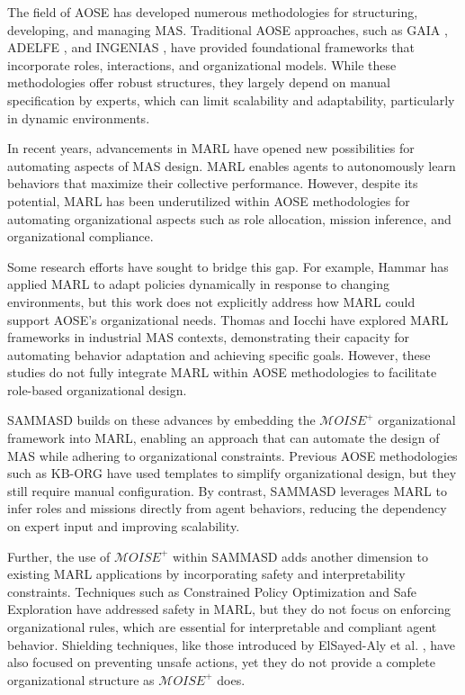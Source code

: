 \documentclass[sigconf,anonymous]{aamas}
\begin{document}
The field of AOSE has developed numerous methodologies for structuring, developing, and managing MAS. Traditional AOSE approaches, such as GAIA \cite{gaia1998}, ADELFE \cite{adelfe2002}, and INGENIAS \cite{ingenias2004}, have provided foundational frameworks that incorporate roles, interactions, and organizational models. While these methodologies offer robust structures, they largely depend on manual specification by experts, which can limit scalability and adaptability, particularly in dynamic environments.

In recent years, advancements in MARL have opened new possibilities for automating aspects of MAS design. MARL enables agents to autonomously learn behaviors that maximize their collective performance. However, despite its potential, MARL has been underutilized within AOSE methodologies for automating organizational aspects such as role allocation, mission inference, and organizational compliance.

Some research efforts have sought to bridge this gap. For example, Hammar \cite{hammar2019} has applied MARL to adapt policies dynamically in response to changing environments, but this work does not explicitly address how MARL could support AOSE's organizational needs. Thomas \cite{thomas2023} and Iocchi \cite{iocchi2023} have explored MARL frameworks in industrial MAS contexts, demonstrating their capacity for automating behavior adaptation and achieving specific goals. However, these studies do not fully integrate MARL within AOSE methodologies to facilitate role-based organizational design.

SAMMASD builds on these advances by embedding the $\mathcal{M}OISE^+$ organizational framework into MARL, enabling an approach that can automate the design of MAS while adhering to organizational constraints. Previous AOSE methodologies such as KB-ORG \cite{kborg2001} have used templates to simplify organizational design, but they still require manual configuration. By contrast, SAMMASD leverages MARL to infer roles and missions directly from agent behaviors, reducing the dependency on expert input and improving scalability.

Further, the use of $\mathcal{M}OISE^+$ within SAMMASD adds another dimension to existing MARL applications by incorporating safety and interpretability constraints. Techniques such as Constrained Policy Optimization \cite{zhao2024} and Safe Exploration \cite{melcer2024} have addressed safety in MARL, but they do not focus on enforcing organizational rules, which are essential for interpretable and compliant agent behavior. Shielding techniques, like those introduced by ElSayed-Aly et al. \cite{elsayed2021}, have also focused on preventing unsafe actions, yet they do not provide a complete organizational structure as $\mathcal{M}OISE^+$ does.
\end{document}
